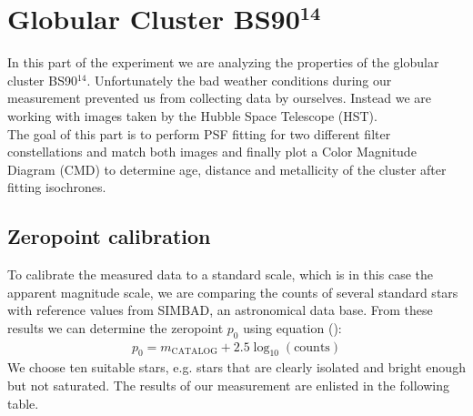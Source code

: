 \chapter{Globular Cluster BS90$^{\mathbf{14}}$}
In this part of the experiment we are analyzing the properties of the globular cluster BS90$^{14}$. Unfortunately the bad weather conditions during our measurement prevented us from collecting data by ourselves. Instead we are working with images taken by the Hubble Space Telescope (HST). \\
The goal of this part is to perform PSF fitting for two different filter constellations and match both images and finally plot a Color Magnitude Diagram (CMD) to determine age, distance and metallicity of the cluster after fitting isochrones.
\section{Zeropoint calibration}
To calibrate the measured data to a standard scale, which is in this case the apparent magnitude scale, we are comparing the counts of several standard stars with reference values from SIMBAD, an astronomical data base. From these results we can determine the zeropoint $p_0$ using equation (): %
	\begin{align}
		p_0 = m_{\text{CATALOG}} + 2.5\log_{10}(\text{counts})
	\end{align}
	We choose ten suitable stars, e.g. stars that are clearly isolated and bright enough but not saturated. The results of our measurement are enlisted in the following table.
